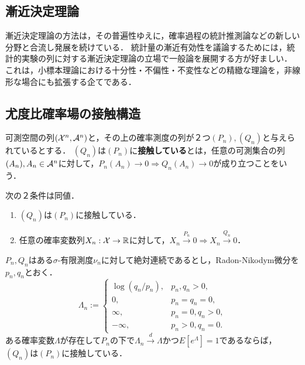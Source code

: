 \documentclass[uplatex,dvipdfmx]{jsreport}
\begin{document}
\subsection{漸近決定理論}

\begin{tcolorbox}[colframe=ForestGreen, colback=ForestGreen!10!white,breakable,colbacktitle=ForestGreen!40!white,coltitle=black,fonttitle=\bfseries\sffamily,
title=]
    漸近決定理論の方法は，その普遍性ゆえに，確率過程の統計推測論などの新しい分野と合流し発展を続けている．
    統計量の漸近有効性を議論するためには，統計的実験の列に対する漸近決定理論の立場で一般論を展開する方が好ましい．
    これは，小標本理論における十分性・不偏性・不変性などの精緻な理論を，非線形な場合にも拡張する企てである．
\end{tcolorbox}

\subsection{尤度比確率場の接触構造}

\begin{definition}[contiguous]
    可測空間の列$(\mathcal{X}^n,\mathcal{A}^n)$と，その上の確率測度の列が２つ$(P_n),(Q_n)$と与えられているとする．
    $(Q_n)$は$(P_n)$に\textbf{接触している}とは，任意の可測集合の列$(A_n),A_n\in\mathcal{A}^n$に対して，$P_n(A_n)\to0\Rightarrow Q_n(A_n)\to0$が成り立つことをいう．
\end{definition}

\begin{lemma}[接触性の特徴付け]
    次の２条件は同値．
    \begin{enumerate}
        \item $(Q_n)$は$(P_n)$に接触している．
        \item 任意の確率変数列$X_n:\mathcal{X}\to\mathbb{R}$に対して，$X_n\xrightarrow{P_n}0\Rightarrow X_n\xrightarrow{Q_n}0$．
    \end{enumerate}
\end{lemma}

\begin{theorem}[接触性の十分条件]
    $P_n,Q_n$はある$\sigma$-有限測度$\nu_n$に対して絶対連続であるとし，Radon-Nikodym微分を$p_n,q_n$とおく．
    \[\Lambda_n:=\begin{cases}
        \log(q_n/p_n),&p_n,q_n>0,\\
        0,&p_n=q_n=0,\\
        \infty,&p_n=0,q_n>0,\\
        -\infty,&p_n>0,q_n=0.
    \end{cases}\]
    ある確率変数$\Lambda$が存在して$P_n$の下で$\Lambda_n\xrightarrow{d}\Lambda$かつ$E[e^\Lambda]=1$であるならば，$(Q_n)$は$(P_n)$に接触している．
\end{theorem}
\end{document}
